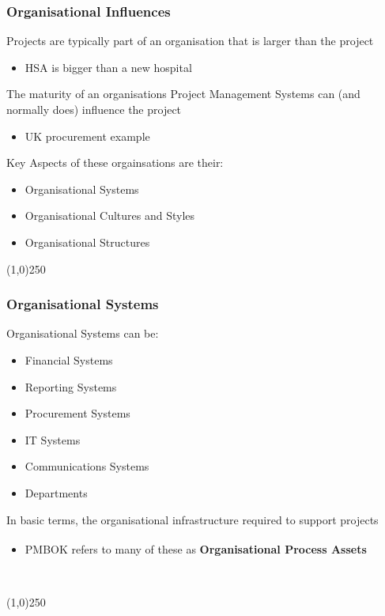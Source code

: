 \begin{frame}
\frametitle{Organisational Influences}
Projects are typically part of an organisation that is larger than the project\\
\begin{itemize}
	\item HSA is bigger than a new hospital
\end{itemize}
The maturity of an organisations Project Management Systems can (and normally does) influence the project\\
\begin{itemize}
	\item UK procurement example
\end{itemize}
Key Aspects of these orgainsations are their:\\
	\begin{itemize}
		\item Organisational Systems
		\item Organisational Cultures and Styles
		\item Organisational Structures
	\end{itemize}
\end{frame}
\begin{center}\line(1,0){250}\end{center}



\begin{frame}
\frametitle{Organisational Systems}
Organisational Systems can be:\\
\begin{itemize}
\item Financial Systems
\item Reporting Systems
\item Procurement Systems
\item IT Systems
\item Communications Systems
\item Departments
\end{itemize}
In basic terms, the organisational infrastructure required to support projects\\
\begin{itemize}
\item PMBOK\textsuperscript{\textregistered} refers to many of these as \textbf{Organisational Process Assets}\
\end{itemize}\
\end{frame}
\begin{center}\line(1,0){250}\end{center}



